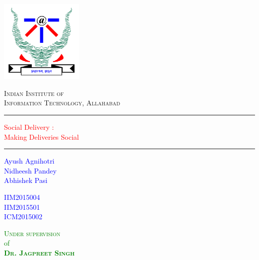 \documentclass{report}
\begin{document}
 

\begin{titlepage}
	\centering
	\includegraphics[width=4cm]{logo.png}\\[.5cm]
	{\scshape\LARGE Indian Institute of \\Information Technology, Allahabad \par}
	\vspace{1cm}
	\rule{\textwidth}{2pt}	
	\vspace{0.15\textheight}
		
	\textcolor{Red}{ 
		{\fontsize{35}{52}\selectfont Social Delivery : \\[8pt] Making Deliveries Social}\\[0.5\baselineskip]
	}
	
	\vspace{0.15\textheight} 
	\setlength\columnsep{0pt}
	\rule{0.3\textwidth}{0.4pt} 
	\begin{multicols}{3} 
	\textcolor{Blue}{
		\begin{flushleft} 
		{\large \quad \quad \quad \quad Ayush Agnihotri}\\[8pt] 
		{\large \quad \quad \quad \quad Nidheesh Pandey}\\[8pt]
		{\large \quad \quad \quad \quad Abhishek Pasi}\\[8pt]
		\end{flushleft}
		}
		\columnbreak
		 
	\textcolor{Blue}{
		\begin{flushleft} 
		{\large IIM2015004}\\[8pt] 
		{\large IIM2015501}\\[8pt]
		{\large ICM2015002}\\[8pt]
		\end{flushleft}
		}
		\columnbreak

	\textcolor{Green}{
		\begin{flushright}
		{\Large \textsc{Under supervision}}\\[8pt]
		{\large of}\\[8pt]
		{\Large \textsc{\textbf{Dr. Jagpreet Singh}}}\\[8pt]
		\end{flushright}
		}
	\end{multicols}
	\vspace{0.015\textheight} 
	

\end{titlepage}
\end{document}
